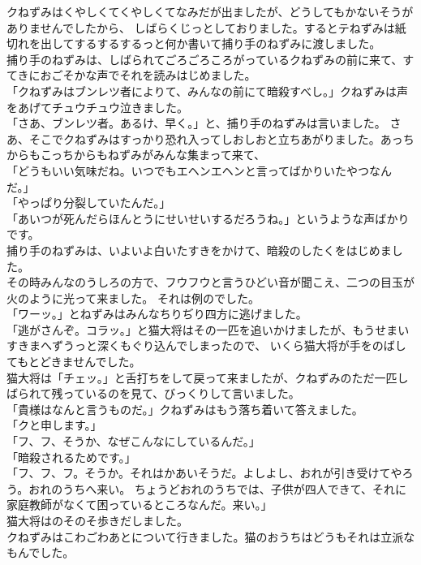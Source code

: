 \documentclass[
a4paper,
10pt,
book]
{tarticle}
\begin{document}
\indent クねずみはくやしくてくやしくてなみだが出ましたが、どうしてもかないそうがありませんでしたから、
しばらくじっとしておりました。するとテねずみは紙切れを出してするするするっと何か書いて捕り手のねずみに渡しました。\\
\indent 捕り手のねずみは、しばられてごろごろころがっているクねずみの前に来て、すてきにおごそかな声でそれを読みはじめました。\\
「クねずみはブンレツ者によりて、みんなの前にて暗殺すべし。」クねずみは声をあげてチュウチュウ泣きました。\\
「さあ、ブンレツ者。あるけ、早く。」と、捕り手のねずみは言いました。
さあ、そこでクねずみはすっかり恐れ入ってしおしおと立ちあがりました。あっちからもこっちからもねずみがみんな集まって来て、\\
「どうもいい気味だね。いつでもエヘンエヘンと言ってばかりいたやつなんだ。」\\
「やっぱり分裂していたんだ。」\\
「あいつが死んだらほんとうにせいせいするだろうね。」というような声ばかりです。\\
\indent 捕り手のねずみは、いよいよ白いたすきをかけて、暗殺のしたくをはじめました。\\
\indent その時みんなのうしろの方で、フウフウと言うひどい音が聞こえ、二つの目玉が火のように光って来ました。
それは例のでした。\\
「ワーッ。」とねずみはみんなちりぢり四方に逃げました。\\
「逃がさんぞ。コラッ。」と猫大将はその一匹を追いかけましたが、もうせまいすきまへずうっと深くもぐり込んでしまったので、
いくら猫大将が手をのばしてもとどきませんでした。\\
\newpage
\indent 猫大将は「チェッ。」と舌打ちをして戻って来ましたが、クねずみのただ一匹しばられて残っているのを見て、びっくりして言いました。\\
「貴様はなんと言うものだ。」クねずみはもう落ち着いて答えました。\\
「クと申します。」\\
「フ、フ、そうか、なぜこんなにしているんだ。」\\
「暗殺されるためです。」\\
「フ、フ、フ。そうか。それはかあいそうだ。よしよし、おれが引き受けてやろう。おれのうちへ来い。
ちょうどおれのうちでは、子供が四人できて、それに家庭教師がなくて困っているところなんだ。来い。」\\
\indent 猫大将はのそのそ歩きだしました。\\
\indent クねずみはこわごわあとについて行きました。猫のおうちはどうもそれは立派なもんでした。
\end{document}
